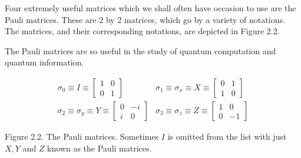 
Four extremely useful matrices which we shall often have occasion to use are the Pauli matrices. These are 2 by 2 matrices, which go by a variety of notations. The matrices, and their corresponding notations, are depicted in Figure 2.2. 

The Pauli matrices are so useful in the study of quantum computation and quantum information.

\begin{equation}
\begin{aligned}
\sigma_{0} \equiv I \equiv\left[\begin{array}{rr}
1 & 0 \\
0 & 1
\end{array}\right] & \sigma_{1} \equiv \sigma_{x} \equiv X \equiv\left[\begin{array}{rr}
0 & 1 \\
1 & 0
\end{array}\right] \\
\sigma_{2} \equiv \sigma_{y} \equiv Y \equiv\left[\begin{array}{rr}
0 & -i \\
i & 0
\end{array}\right] & \sigma_{3} \equiv \sigma_{z} \equiv Z \equiv\left[\begin{array}{rr}
1 & 0 \\
0 & -1
\end{array}\right]
\end{aligned}
\end{equation}

Figure 2.2. The Pauli matrices. Sometimes $I$ is omitted from the list with just $X, Y$ and $Z$ known as the Pauli matrices.